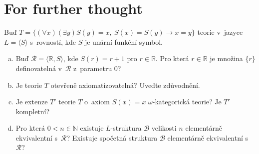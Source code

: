 \section*{For further thought}


\begin{problem}

    Buď $T=\{(\forall x)(\exists y) S(y)=x,\ S(x)=S(y)\to x=y\}$ teorie v~jazyce $L=\langle S\rangle$ s~rovností, kde $S$ je unární funkční symbol.
    \begin{enumerate}[(a)]
        \item Buď $\mathcal{R}=\langle\mathbb{R},S\rangle$, kde $S(r)=r+1$ pro $r\in\mathbb{R}$. Pro která $r\in\mathbb{R}$ je množina $\{r\}$ definovatelná v~$\mathcal{R}$ z~parametru $0$?
        \item Je teorie $T$ otevřeně axiomatizovatelná? Uveďte zdůvodnění.
        \item Je extenze $T'$ teorie $T$ o~axiom $S(x)=x$ $\omega$-kategorická teorie? Je $T'$ kompletní?
        \item Pro která $0<n\in\mathbb{N}$ existuje $L$-struktura $\mathcal{B}$ velikosti $n$ elementárně ekvivalentní s~$\mathcal{R}$? Existuje spočetná struktura $\mathcal{B}$ elementárně ekvivalentní s~$\mathcal{R}$?
    \end{enumerate}

\end{problem}



